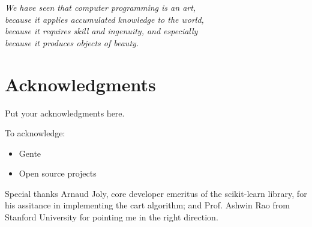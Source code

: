 
\begin{flushright}{\slshape
    We have seen that computer programming is an art, \\
    because it applies accumulated knowledge to the world, \\
    because it requires skill and ingenuity, and especially \\
    because it produces objects of beauty.} \\ \medskip
\end{flushright}



\bigskip

{
    \chapter*{Acknowledgments}
    Put your acknowledgments here.

    To acknowledge:
    \begin{itemize}
        \item Gente
        \item Open source projects
    \end{itemize}

    \bigskip

    Special thanks Arnaud Joly, core developer emeritus of the scikit-learn
    library, for his assitance in implementing the \ac{cart} algorithm; and Prof.
    Ashwin Rao from Stanford University for pointing me in the right direction.
}